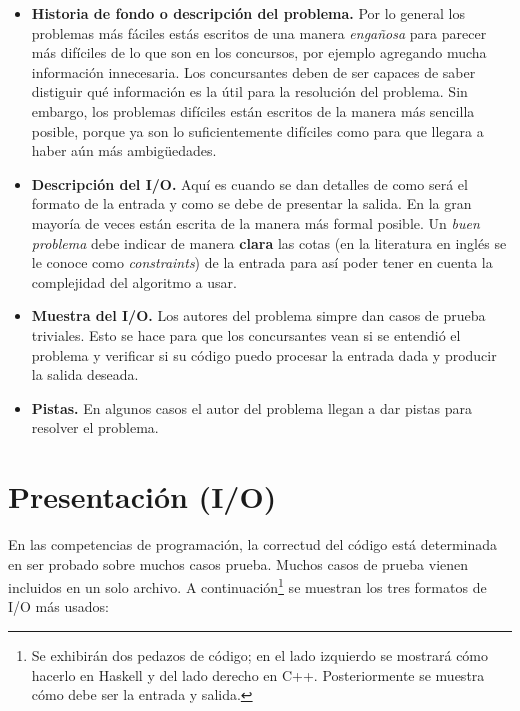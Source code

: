 \begin{itemize}
\item \textbf{Historia de fondo o descripción del problema.} Por lo general los problemas más
fáciles estás escritos de una manera \emph{engañosa} para parecer más difíciles de lo que son en
los concursos, por ejemplo agregando mucha información innecesaria. Los concursantes deben de
ser capaces de saber distiguir qué información es la útil para la resolución del problema. Sin
embargo, los problemas difíciles están escritos de la manera más sencilla posible, porque ya
son lo suficientemente difíciles como para que llegara a haber aún más ambigüedades.

\item \textbf{Descripción del I/O.} Aquí es cuando se dan detalles de como será el formato de la
entrada y como se debe de presentar la salida. En la gran mayoría de veces están escrita de la
manera más formal posible. Un \emph{buen problema} debe indicar de manera \textbf{clara} las cotas 
(en la literatura en inglés se le conoce como \emph{constraints}) de la entrada para así poder
tener en cuenta la complejidad del algoritmo a usar.

\item \textbf{Muestra del I/O.} Los autores del problema simpre dan casos de prueba triviales. Esto
se hace para que los concursantes vean si se entendió el problema y verificar si su código puedo
procesar la entrada dada y producir la salida deseada.

\item \textbf{Pistas.} En algunos casos el autor del problema llegan a dar pistas para resolver
el problema.

\end{itemize}

\section{Presentación (I/O)}

En las competencias de programación, la correctud del código está determinada en ser probado
sobre muchos casos prueba. Muchos casos de prueba vienen incluidos en un solo archivo. A
continuación\footnote{
    Se exhibirán dos pedazos de código; en el lado izquierdo se mostrará cómo hacerlo en Haskell
    y del lado derecho en C++. Posteriormente se muestra cómo debe ser la entrada y salida.
} se muestran los tres formatos de I/O más usados:


